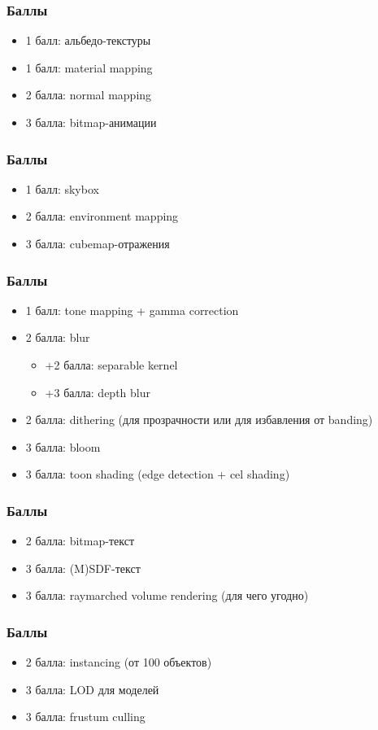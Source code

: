 \documentclass{beamer}
\begin{document}
\begin{frame}[fragile]
\frametitle{Баллы}
\begin{itemize}
\item 1 балл: альбедо-текстуры
\item 1 балл: material mapping
\item 2 балла: normal mapping
\item 3 балла: bitmap-анимации
\end{itemize}
\end{frame}

\begin{frame}[fragile]
\frametitle{Баллы}
\begin{itemize}
\item 1 балл: skybox
\item 2 балла: environment mapping
\item 3 балла: cubemap-отражения
\end{itemize}
\end{frame}

\begin{frame}[fragile]
\frametitle{Баллы}
\begin{itemize}
\item 1 балл: tone mapping + gamma correction
\item 2 балла: blur
\begin{itemize}
\item +2 балла: separable kernel
\item +3 балла: depth blur
\end{itemize}
\item 2 балла: dithering (для прозрачности или для избавления от banding)
\item 3 балла: bloom
\item 3 балла: toon shading (edge detection + cel shading)
\end{itemize}
\end{frame}

\begin{frame}[fragile]
\frametitle{Баллы}
\begin{itemize}
\item 2 балла: bitmap-текст
\item 3 балла: (M)SDF-текст
\item 3 балла: raymarched volume rendering (для чего угодно)
\end{itemize}
\end{frame}

\begin{frame}[fragile]
\frametitle{Баллы}
\begin{itemize}
\item 2 балла: instancing (от 100 объектов)
\item 3 балла: LOD для моделей
\item 3 балла: frustum culling
\end{itemize}
\end{frame}
\end{document}
